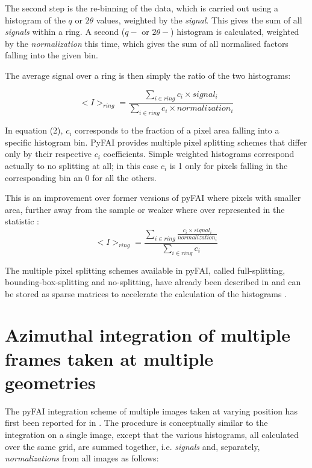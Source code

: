 \documentclass[preprint]{iucr}              %
\begin{document}
The second step is the re-binning of the data, which is carried out 
using a histogram of the $q$ or $2\theta$ values, weighted by the
\textit{signal}.
This gives the sum of all \textit{signals} within a ring.
A second ($q-$ or $2\theta-$) histogram is calculated, weighted
by the \textit{normalization} this time, which gives the sum of all
normalised factors falling into the given bin.

The average signal over a ring is then simply the ratio of the two histograms:

\begin{equation}
<I>_{ring} = \frac{\sum\limits_{i \in ring} c_i \times signal_i}
                  {\sum\limits_{i \in ring} c_i \times normalization_i} 
\end{equation}

In equation (2), $c_i$ corresponds to the fraction of a pixel area 
falling into a specific histogram bin. 
PyFAI provides multiple pixel splitting schemes that differ only by their
respective $c_i$ coefficients. 
Simple weighted histograms correspond actually to no splitting at all; in this
case $c_i$ is 1 only for pixels falling in the corresponding bin an 0 for all
the others.

This is an improvement over former versions of pyFAI where pixels with
smaller area, further away from the sample or weaker where over represented in
the statistic :
\begin{equation}
<I>_{ring} = \frac{\sum\limits_{i \in ring} \frac{ c_i \times
signal_i}{normalization_i}} {\sum\limits_{i \in ring} c_i} 
\end{equation}

The multiple pixel splitting schemes available in pyFAI, called full-splitting, 
bounding-box-splitting and no-splitting, have already been described in
  and can be stored as sparse matrices to accelerate the
 calculation of the histograms \cite{kieffer_ashiotis-proc-euroscipy-2014}.

\section{Azimuthal integration of multiple frames taken at multiple geometries}

The pyFAI integration scheme of multiple images taken at varying position has
first been reported for  in  \cite{PyFAI_PDJ}. 
The procedure is conceptually similar to the integration on a single image,
except that the various histograms, all calculated over the same
grid, are summed together, i.e. \textit{signals} and, separately, 
\textit{normalizations} from all images as follows: 
\end{document}
